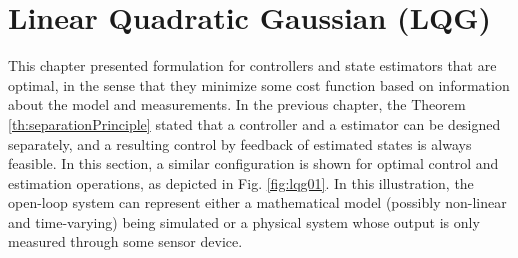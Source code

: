 \documentclass[a4paper,11pt]{book}
\numberwithin{figure}{chapter}
\numberwithin{equation}{chapter}
\numberwithin{table}{chapter}
\theoremstyle{definition}
\begin{document}
\section{Linear Quadratic Gaussian (LQG)}

This chapter presented formulation for controllers and state estimators that are optimal, in the sense that they minimize some cost function based on information about the model and measurements. In the previous chapter, the Theorem \ref{th:separationPrinciple} stated that a controller and a estimator can be designed separately, and a resulting control by feedback of estimated states is always feasible. In this section, a similar configuration is shown for optimal control and estimation operations, as depicted in Fig. \ref{fig:lqg01}. In this illustration, the open-loop system can represent either a mathematical model (possibly non-linear and time-varying) being simulated or a physical system whose output is only measured through some sensor device. 
\end{document}
